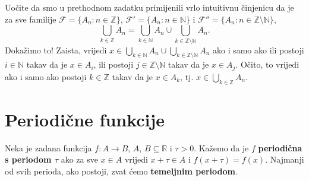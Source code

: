\newpage
\begin{remark}
Uočite da smo u prethodnom zadatku primijenili vrlo intuitivnu činjenicu da je za sve familije $\mathcal{F}=\{A_n : n\in \mathbb{Z}\}$, $\mathcal{F}'=\{A_n : n\in \mathbb{N}\}$ i $\mathcal{F}''=\{A_n : n\in \mathbb{Z}\setminus\mathbb{N}\}$,
$$\bigcup_{k\in \mathbb{Z}}{A_n}=\bigcup_{k\in \mathbb{N}}{A_n}\cup \bigcup_{k\in \mathbb{Z}\setminus\mathbb{N}}{A_n}.$$
Dokažimo to! Zaista, vrijedi $\displaystyle x\in \bigcup_{k\in \mathbb{N}}{A_n}\cup \bigcup_{k\in \mathbb{Z}\setminus\mathbb{N}}{A_n}$ ako i samo ako ili postoji $i\in \mathbb{N}$ takav da je $x\in A_i$, ili postoji $j\in \mathbb{Z}\setminus\mathbb{N}$ takav da je $x\in A_j$. Očito, to vrijedi ako i samo ako postoji $k\in \mathbb{Z}$ takav da je $x\in A_k$, tj. $\displaystyle x\in \bigcup_{k\in \mathbb{Z}}{A_n}$.
\end{remark}

\section{Periodične funkcije}

\begin{definition}
Neka je zadana funkcija $f : A\to B$, $A$, $B\subseteq \mathbb{R}$ i $\tau>0$. Kažemo da je $f$ \textbf{periodična s periodom $\tau$} ako za sve $x\in A$ vrijedi $x+\tau \in A$ i $f(x+\tau)=f(x)$. Najmanji od svih perioda, ako postoji, zvat ćemo \textbf{temeljnim periodom}.
\end{definition}

